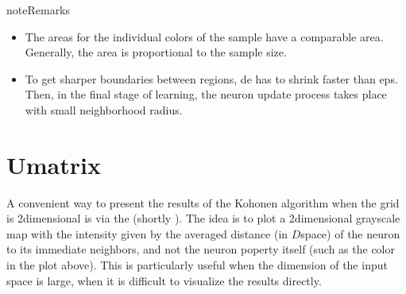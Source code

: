 \documentclass[letterpaper,10pt,english]{jupyterBook}
\begin{document}
\begin{sphinxVerbatim}[commandchars=\\\{\}]

   
       
        \PYG{p}{[}\PYG{p}{]}\PYG{p}{[}\PYG{p}{]} 

\end{sphinxVerbatim}

\noindent{}

\begin{sphinxadmonition}{note}{Remarks}
\begin{itemize}
\item {} 
\sphinxAtStartPar
The areas for the individual colors of the sample have a comparable area. Generally, the area is proportional to the sample size.

\item {} 
\sphinxAtStartPar
To get sharper boundaries between regions, de has to shrink faster than eps. Then, in the final stage of learning, the neuron update process takes place with small neighborhood radius.

\end{itemize}
\end{sphinxadmonition}


\section{U\sphinxhyphen{}matrix}
\label{\detokenize{docs/som:u-matrix}}
\sphinxAtStartPar
A convenient way to present the results of the Kohonen algorithm when the grid is 2\sphinxhyphen{}dimensional is via the  (shortly ). The idea is to plot a 2\sphinxhyphen{}dimensional grayscale map with the intensity given by the averaged distance (in \(D\)\sphinxhyphen{}space) of the neuron to its immediate neighbors, and not the neuron poperty itself (such as the color in the plot above). This is particularly useful when the dimension of the input space is large, when it is difficult to visualize the results directly.
\end{document}
